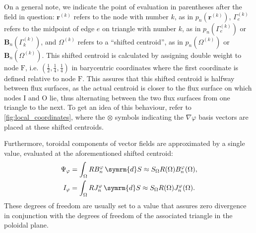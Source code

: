 \documentclass[a4paper, twoside, 10pt, english]{article}
\numberwithin{equation}{section}
\let\temp\varrho
\let\varrho\rho
\let\rho\temp
\let\temp\vartheta
\let\vartheta\theta
\let\theta\temp
\let\temp\varphi
\let\varphi\phi
\let\phi\temp
\let\vec\symbf
\newcommand*\grad{\ensuremath{\nabla}}
\newcommand*\diff{\ensuremath{\symrm{d}}}  %
\newcommand*\vfs{\ensuremath{\textrm{F}}}  %
\newcommand*\vinw{\ensuremath{\textrm{I}}}  %
\newcommand*\vout{\ensuremath{\textrm{O}}}  %
\begin{document}
On a general note, we indicate the point of evaluation in parentheses after the field in question: $\vec{r}^{(k)}$ refers to the node with number $k$, as in $p_{n} (\vec{r}^{(k)})$, $\Gamma_{e}^{(k)}$ refers to the midpoint of edge $e$ on triangle with number $k$, as in $p_{n} (\Gamma_{e}^{(k)})$ or $\vec{B}_{n} (\Gamma_{k}^{(k)})$, and $\Omega^{(k)}$ refers to a \enquote{shifted centroid}, as in $p_{n} (\Omega^{(k)})$ or $\vec{B}_{n} (\Omega^{(k)})$. This shifted centroid is calculated by assigning double weight to node $\vfs$, i.e. $\left ( \frac{1}{2}, \frac{1}{4}, \frac{1}{4} \right )$ in barycentric coordinates where the first coordinate is defined relative to node $\vfs$. This assures that this shifted centroid is halfway between flux surfaces, as the actual centroid is closer to the flux surface on which nodes $\vinw$ and $\vout$ lie, thus alternating between the two flux surfaces from one triangle to the next. To get an idea of this behaviour, refer to \cref{fig:local_coordinates}, where the $\otimes$ symbols indicating the $\grad \phi$ basis vectors are placed at these shifted centroids.

Furthermore, toroidal components of vector fields are approximated by a single value, evaluated at the aforementioned shifted centroid:
\begin{gather}
  \Psi_{\phi} = \int_{\Omega} R B_{n}^{\phi} \, \diff S \approx S_{\Omega} R (\Omega) B_{n}^{\phi} (\Omega), \label{eq:Psi_phi} \\
  I_{\phi} = \int_{\Omega} R J_{n}^{\phi} \, \diff S \approx S_{\Omega} R (\Omega) J_{n}^{\phi} (\Omega). \label{eq:I_phi}
\end{gather}
These degrees of freedom are usually set to a value that assures zero divergence in conjunction with the degrees of freedom of the associated triangle in the poloidal plane.
\end{document}
